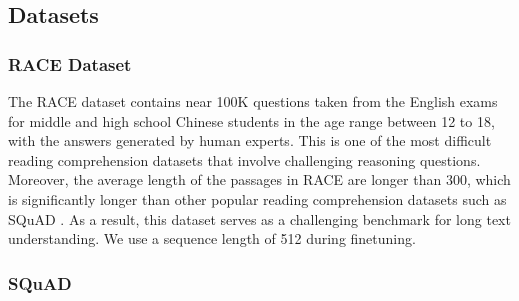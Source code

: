 
\subsection{Datasets} \label{sec:datasets}

\subsubsection{RACE Dataset}

The RACE dataset \cite{lai2017large} contains near 100K questions taken from the English exams for middle and high school Chinese students in the age range between 12 to 18, with the answers generated by human experts. This is one of the most difficult reading comprehension datasets that involve challenging reasoning questions. Moreover, the average length of the passages in RACE are longer than 300, which is significantly longer than other popular reading comprehension datasets such as SQuAD \cite{rajpurkar2018know}. As a result, this dataset serves as a challenging benchmark for long text understanding. We use a sequence length of 512 during finetuning.

\subsubsection{SQuAD}

